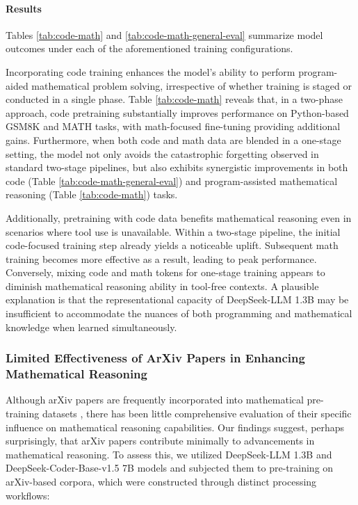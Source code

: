 \paragraph{Results}
Tables \ref{tab:code-math} and \ref{tab:code-math-general-eval} summarize model outcomes under each of the aforementioned training configurations.

Incorporating code training enhances the model's ability to perform program-aided mathematical problem solving, irrespective of whether training is staged or conducted in a single phase. Table \ref{tab:code-math} reveals that, in a two-phase approach, code pretraining substantially improves performance on Python-based GSM8K and MATH tasks, with math-focused fine-tuning providing additional gains. Furthermore, when both code and math data are blended in a one-stage setting, the model not only avoids the catastrophic forgetting observed in standard two-stage pipelines, but also exhibits synergistic improvements in both code (Table \ref{tab:code-math-general-eval}) and program-assisted mathematical reasoning (Table \ref{tab:code-math}) tasks.

Additionally, pretraining with code data benefits mathematical reasoning even in scenarios where tool use is unavailable. Within a two-stage pipeline, the initial code-focused training step already yields a noticeable uplift. Subsequent math training becomes more effective as a result, leading to peak performance. Conversely, mixing code and math tokens for one-stage training appears to diminish mathematical reasoning ability in tool-free contexts. A plausible explanation is that the representational capacity of DeepSeek-LLM 1.3B may be insufficient to accommodate the nuances of both programming and mathematical knowledge when learned simultaneously.

\subsubsection{Limited Effectiveness of ArXiv Papers in Enhancing Mathematical Reasoning}

Although arXiv papers are frequently incorporated into mathematical pre-training datasets \citep{minerva,gpt-f,llemma,mathpile}, there has been little comprehensive evaluation of their specific influence on mathematical reasoning capabilities. Our findings suggest, perhaps surprisingly, that arXiv papers contribute minimally to advancements in mathematical reasoning. To assess this, we utilized DeepSeek-LLM 1.3B and DeepSeek-Coder-Base-v1.5 7B \citep{deepseek-coder} models and subjected them to pre-training on arXiv-based corpora, which were constructed through distinct processing workflows:

